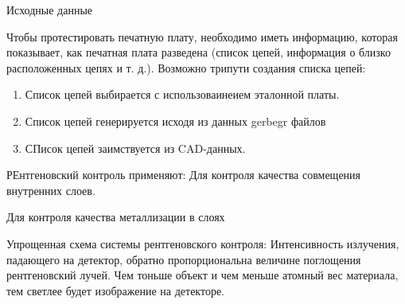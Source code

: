 \documentclass{article}
\begin{document}
Исходные данные

Чтобы протестировать печатную плату, необходимо иметь информацию, которая показывает, как печатная плата разведена (список цепей, информация о близко расположенных цепях и т. д.).
Возможно трипути создания списка цепей:
\begin{enumerate}
	\item Список цепей выбирается с использоваинеием эталонной платы.
	\item Список цепей генерируется исходя из данных gerbegr файлов
	\item СПисок цепей заимствуется из CAD-данных.

\end{enumerate}

РЕнтгеновский контроль применяют:
Для контроля качества совмещения внутренних слоев.

Для контроля качества металлизации в слоях

Упрощенная схема системы рентгеновского контроля:
Интенсивность излучения, падающего на детектор, обратно пропорциональна величине поглощения рентгеновский лучей. Чем тоньше объект и чем меньше атомный вес материала, тем светлее будет изображение на детекторе.
\end{document}
